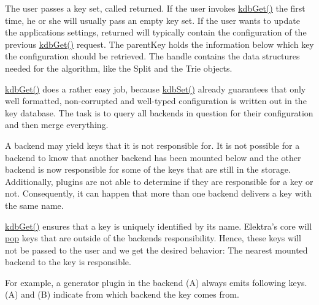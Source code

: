 The user passes a key set, called {\ttfamily returned}. If the user invokes {\ttfamily \mbox{\hyperlink{group__kdb_ga28e385fd9cb7ccfe0b2f1ed2f62453a1}{kdb\+Get()}}} the first time, he or she will usually pass an empty key set. If the user wants to update the application\textquotesingle{}s settings, {\ttfamily returned} will typically contain the configuration of the previous {\ttfamily \mbox{\hyperlink{group__kdb_ga28e385fd9cb7ccfe0b2f1ed2f62453a1}{kdb\+Get()}}} request. The {\ttfamily parent\+Key} holds the information below which key the configuration should be retrieved. The {\ttfamily handle} contains the data structures needed for the algorithm, like the {\ttfamily Split} and the {\ttfamily Trie} objects.

{\ttfamily \mbox{\hyperlink{group__kdb_ga28e385fd9cb7ccfe0b2f1ed2f62453a1}{kdb\+Get()}}} does a rather easy job, because {\ttfamily \mbox{\hyperlink{group__kdb_ga11436b058408f83d303ca5e996832bcf}{kdb\+Set()}}} already guarantees that only well formatted, non-\/corrupted and well-\/typed configuration is written out in the key database. The task is to query all backends in question for their configuration and then merge everything.

A backend may yield keys that it is not responsible for. It is not possible for a backend to know that another backend has been mounted below and the other backend is now responsible for some of the keys that are still in the storage. Additionally, plugins are not able to determine if they are responsible for a key or not. Consequently, it can happen that more than one backend delivers a key with the same name.

{\ttfamily \mbox{\hyperlink{group__kdb_ga28e385fd9cb7ccfe0b2f1ed2f62453a1}{kdb\+Get()}}} ensures that a key is uniquely identified by its name. Elektra’s core will \mbox{\hyperlink{doc_help_elektra-glossary_md}{pop}} keys that are outside of the backend\textquotesingle{}s responsibility. Hence, these keys will not be passed to the user and we get the desired behavior\+: The nearest mounted backend to the key is responsible.

For example, a generator plugin in the backend (A) always emits following keys. (A) and (B) indicate from which backend the key comes from.


\begin{DoxyCode}{0}
\end{DoxyCode}


